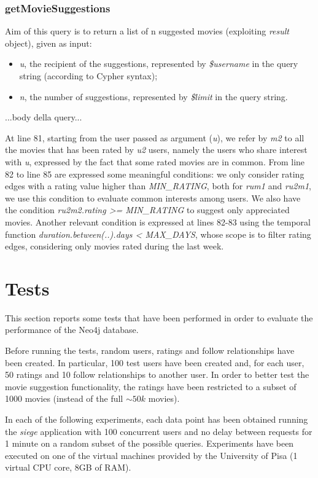 \documentclass[11pt]{article}
\begin{document}
\subsubsection{getMovieSuggestions}
Aim of this query is to return a list of n suggested movies (exploiting \emph{result} object), given as input:
\begin{itemize}
    \item \emph{u}, the recipient of the suggestions, represented by \emph{\$username} in the query string (according to Cypher syntax);
    \item \emph{n}, the number of suggestions, represented by \emph{\$limit} in the query string.
\end{itemize}

...body della query...

At line 81, starting from the user passed as argument (\emph{u}), we refer by \emph{m2} to all the movies that has been rated by \emph{u2} users, namely the users who share interest with \emph{u}, expressed by the fact that some rated movies are in common. 
From line 82 to line 85 are expressed some meaningful conditions: we only consider rating edges with a rating value higher than \emph{MIN\_RATING}, both for \emph{rum1} and \emph{ru2m1}, we use this condition to evaluate common interests among users. We also have the condition \emph{ru2m2.rating >= MIN\_RATING} to suggest only appreciated movies. Another relevant condition is expressed at lines 82-83 using the temporal function \emph{duration.between(..).days < MAX\_DAYS}, whose scope is to filter rating edges, considering only movies rated during the last week. 

\section{Tests}
This section reports some tests that have been performed in order to evaluate 
the performance of the Neo4j database.

Before running the tests, random users, ratings and follow relationships have 
been created. In particular, 100 test users have been created and, for each 
user, 50 ratings and 10 follow relationships to another user. In order to 
better test the movie suggestion functionality, the ratings have been restricted
to a subset of 1000 movies (instead of the full $\sim50k$ movies).

In each of the following experiments, each data point has been obtained running 
the \emph{siege} application with 100 concurrent users and no delay between 
requests for 1 minute on a random subset of the possible queries. Experiments 
have been executed on one of the virtual machines provided by the University 
of Pisa (1 virtual CPU core, 8GB of RAM).
\end{document}

